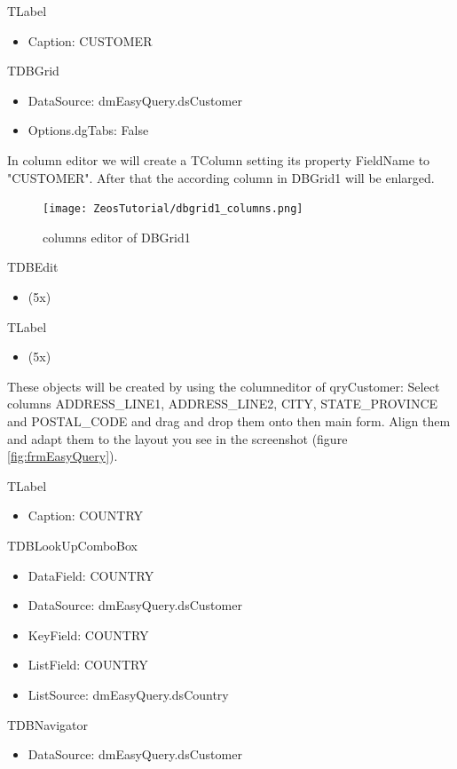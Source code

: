 \documentclass[a4paper,12pt,oneside]{book}
\begin{document}
TLabel
\begin{itemize}
  \item Caption: CUSTOMER
\end{itemize}

TDBGrid
\begin{itemize}
  \item DataSource: dmEasyQuery.dsCustomer
	\item Options.dgTabs: False
\end{itemize}

In column editor we will create a TColumn setting its property FieldName to "CUSTOMER".
After that the according column in DBGrid1 will be enlarged.

\begin{figure}[htbp] 
  \centering
  \texttt{[image: ZeosTutorial/dbgrid1\_columns.png]}
  \caption{columns editor of DBGrid1}
  \label{fig:dbgrid1_columns}
\end{figure}

TDBEdit
\begin{itemize}
  \item (5x)
\end{itemize}

TLabel
\begin{itemize}
  \item (5x)
\end{itemize}

These objects will be created by using the columneditor of qryCustomer:
Select columns ADDRESS\_LINE1, ADDRESS\_LINE2, CITY, STATE\_PROVINCE and POSTAL\_CODE and drag and drop them onto then main form.
Align them and adapt them to the layout you see in the screenshot (figure \ref{fig:frmEasyQuery}).

TLabel
\begin{itemize}
  \item Caption: COUNTRY
\end{itemize}

TDBLookUpComboBox
\begin{itemize}
  \item DataField: COUNTRY
	\item DataSource: dmEasyQuery.dsCustomer
	\item KeyField: COUNTRY
	\item ListField: COUNTRY
	\item ListSource: dmEasyQuery.dsCountry
\end{itemize}

TDBNavigator
\begin{itemize}
  \item DataSource: dmEasyQuery.dsCustomer
\end{itemize}
\end{document}
